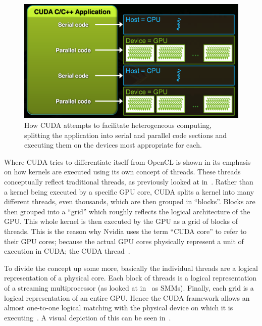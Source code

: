 \documentclass[a4paper,11pt]{article}
\begin{document}
\begin{figure}[ht]
  \centering
  \includegraphics[scale=0.3]{img/cuda-hetero}
  \caption{How CUDA attempts to facilitate heterogeneous computing, splitting the application into serial and parallel
  code sections and executing them on the devices most appropriate for each.~\cite{slides:KhronosOpenCLOverview}}
\label{fig:cuda-hetero}
\end{figure}

Where CUDA tries to differentiate itself from OpenCL is shown in its emphasis on how kernels are executed using its own
concept of threads. These threads conceptually reflect traditional threads, as previously looked at in~.
Rather than a kernel being executed by a specific GPU core, CUDA splits a kernel into many different threads, even thousands,
which are then grouped in ``blocks''. Blocks are then grouped into a ``grid'' which roughly reflects the logical architecture
of the GPU. This whole kernel is then executed by the GPU as a grid of blocks of threads. This is the reason why Nvidia
uses the term ``CUDA core'' to refer to their GPU cores; because the actual GPU cores physically represent a unit of
execution in CUDA; the CUDA thread~\cite{slides:KhronosOpenCLOverview}.

To divide the concept up some more, basically the individual threads are a logical representation of a physical core. Each
block of threads is a logical representation of a streaming multiprocessor (as looked at in~ as SMMs).
Finally, each grid is a logical representation of an entire GPU. Hence the CUDA framework allows an almost one-to-one
logical matching with the physical device on which it is executing~\cite{slides:KhronosOpenCLOverview}. A visual depiction of this can be seen in~.
\end{document}
